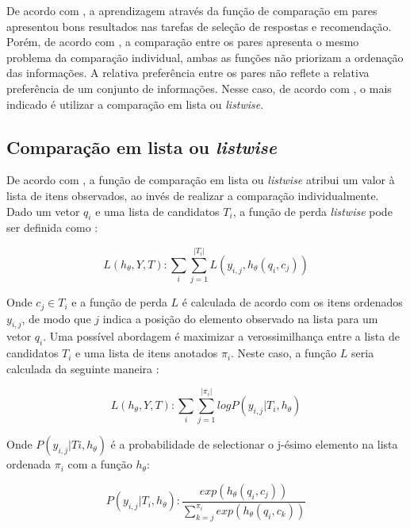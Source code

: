 De acordo com \cite{feng-2015, guo-deep-look-into-neural-ranking-models:2019, wu-sql-rank-listwise-approach:2018}, a aprendizagem através da função de comparação em pares apresentou bons resultados nas tarefas de seleção de respostas e recomendação. Porém, de acordo com \cite{wu-sql-rank-listwise-approach:2018}, a comparação entre os pares apresenta o mesmo problema da comparação individual, ambas as funções não priorizam a ordenação das informações. A relativa preferência entre os pares não reflete a relativa preferência de um conjunto de informações. Nesse caso, de acordo com \cite{wu-sql-rank-listwise-approach:2018}, o mais indicado é utilizar a comparação em lista ou \textit{listwise}.


\subsection{Comparação em lista ou \textit{listwise}}

De acordo com \cite{wu-sql-rank-listwise-approach:2018}, a função de comparação em lista ou \textit{listwise} atribui um valor à lista de itens observados, ao invés de realizar a comparação individualmente. Dado um vetor $q_{i}$ e uma lista de candidatos $T_{i}$, a função de perda \textit{listwise} pode ser definida como \citep{guo-deep-look-into-neural-ranking-models:2019}:

\begin{equation}
    L (h_{\theta}, Y, T): \sum_{i} \sum_{j = 1}^{|T_{i}|} L( y_{i,j}, h_{\theta}(q_{i}, c_{j}))
\end{equation}

Onde $c_{j} \in T_{i}$ e a função de perda $L$ é calculada de acordo com os itens ordenados $y_{i,j}$, de modo que $j$ indica a posição do elemento observado na lista para um vetor $q_{i}$. Uma possível abordagem é maximizar a verossimilhança entre a lista de candidatos $T_{i}$ e uma lista de itens anotados $\pi_{i}$. Neste caso, a função $L$ seria calculada da seguinte maneira \citep{guo-deep-look-into-neural-ranking-models:2019}:

\begin{equation}
    L (h_{\theta}, Y, T): \sum_{i} \sum_{j = 1}^{|\pi_{i}|} log P( y_{i,j} | T_{i}, h_{\theta})
\end{equation}

Onde $P(y_{i,j} | T{i}, h_{\theta})$ é a probabilidade de selectionar o j-ésimo elemento na lista ordenada $\pi_{i}$ com a função $h_{\theta}$:

\begin{equation}
    P(y_{i,j} | T_{i}, h_{\theta}): \frac{exp(h_{\theta}(q_{i}, c_{j}))}{\sum_{k = j}^{\pi_{i}} exp(h_{\theta}(q_{i}, c_{k}))}
\end{equation}

